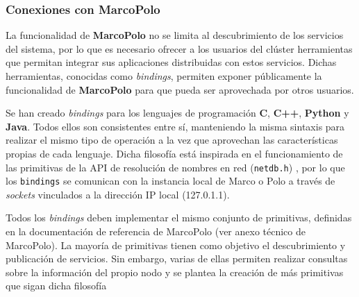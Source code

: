 \subsubsection{Conexiones con MarcoPolo}
\label{marcopolo:bindings}
La funcionalidad de \textbf{MarcoPolo} no se limita al descubrimiento de los servicios del sistema, por lo que es necesario ofrecer a los usuarios del clúster herramientas que permitan integrar sus aplicaciones distribuidas con estos servicios. Dichas herramientas, conocidas como \textit{bindings}, permiten exponer públicamente la funcionalidad de \textbf{MarcoPolo} para que pueda ser aprovechada por otros usuarios.

Se han creado \textit{bindings} para los lenguajes de programación \textbf{C}, \textbf{C++}, \textbf{Python} y \textbf{Java}. Todos ellos son consistentes entre sí, manteniendo la misma sintaxis para realizar el mismo tipo de operación a la vez que aprovechan las características propias de cada lenguaje. Dicha filosofía está inspirada en el funcionamiento de las primitivas de la API de resolución de nombres en red (\texttt{netdb.h}) \cite{netdb}, por lo que los \texttt{bindings} se comunican con la instancia local de Marco o Polo a través de \textit{sockets} vinculados a la dirección IP local (127.0.1.1).

Todos los \textit{bindings} deben implementar el mismo conjunto de primitivas, definidas en la documentación de referencia de MarcoPolo (ver anexo técnico de MarcoPolo). La mayoría de primitivas tienen como objetivo el descubrimiento y publicación de servicios. Sin embargo, varias de ellas permiten realizar consultas sobre la información del propio nodo y se plantea la creación de más primitivas que sigan dicha filosofía



